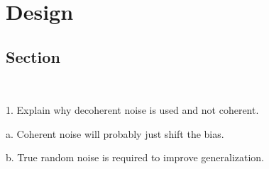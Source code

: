\chapter{Design}\label{chapter:design}

\section{Section} \

1.	Explain why decoherent noise is used and not coherent. \

  a. Coherent noise will probably just shift the bias. \

  b. True random noise is required to improve generalization. \